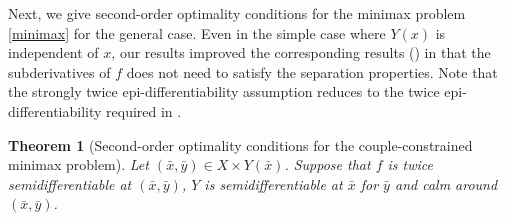 \documentclass[11pt]{article}
\numberwithin{equation}{section}
\newtheorem{theorem}{Theorem}[section]
\begin{document}
{Next, we give  second-order optimality conditions for the minimax problem \eqref{minimax} for the general case. Even in the simple case where $Y(x)$ is independent of $x$, our results improved the corresponding results    (\cite[Theorem 4.2]{Ma2023}) in that  the subderivatives of $f$ does not need to satisfy the separation properties. Note that the strongly twice epi-differentiability assumption reduces to the twice epi-differentiability required in \cite[Theorem 4.2]{Ma2023}.




\begin{theorem}[Second-order optimality conditions for the couple-constrained minimax problem]\label{main1}
Let $(\bar x, \bar y)\in X \times Y(\bar x)$. Suppose that $f$ is twice semidifferentiable at $(\bar x, \bar y)$, $Y$ is semidifferentiable at $\bar x$ for $\bar y$ and calm around $(\bar x,\bar y)$. 



\end{theorem}}
\end{document}
